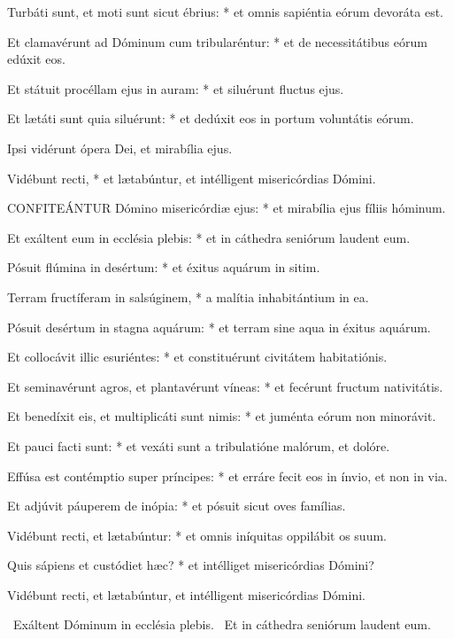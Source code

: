 Turbáti sunt, et moti sunt sicut ébrius: * et omnis sapiéntia eórum devoráta est.

Et clamavérunt ad Dóminum cum tribularéntur: * et de necessitátibus eórum edúxit eos.

Et státuit procéllam ejus in auram: * et siluérunt fluctus ejus.

Et lætáti sunt quia siluérunt: * et dedúxit eos in portum voluntátis eórum.

 Ipsi vidérunt ópera Dei, et mirabília ejus.

 Vidébunt recti, * et lætabúntur, et intélligent misericórdias Dómini.


\lettrine[lines=2]{C}{ONFITEÁNTUR} Dómino misericórdiæ ejus: * et mirabília ejus fíliis hóminum.

Et exáltent eum in ecclésia plebis: * et in cáthedra seniórum laudent eum.

Pósuit flúmina in desértum: * et éxitus aquárum in sitim.

Terram fructíferam in salsúginem, * a malítia inhabitántium in ea.

Pósuit desértum in stagna aquárum: * et terram sine aqua in éxitus aquárum.

Et collocávit illic esuriéntes: * et constituérunt civitátem habitatiónis.

Et seminavérunt agros, et plantavérunt víneas: * et fecérunt fructum nativitátis.

Et benedíxit eis, et multiplicáti sunt nimis: * et juménta eórum non minorávit.

Et pauci facti sunt: * et vexáti sunt a tribulatióne malórum, et dolóre.

Effúsa est contémptio super príncipes: * et erráre fecit eos in ínvio, et non in via.

Et adjúvit páuperem de inópia: * et pósuit sicut oves famílias.

Vidébunt recti, et lætabúntur: * et omnis iníquitas oppilábit os suum.

Quis sápiens et custódiet hæc? * et intélliget misericórdias Dómini?

 Vidébunt recti, et lætabúntur, et intélligent misericórdias Dómini.


\V\ Exáltent Dóminum in ecclésia plebis. \R\ Et in cáthedra seniórum laudent eum.

